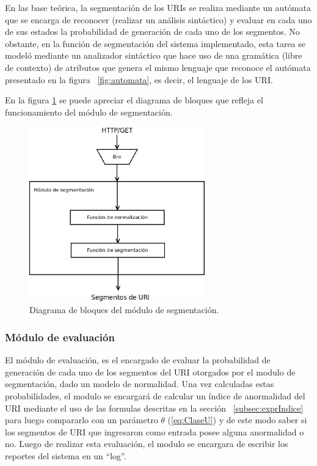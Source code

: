  En las base teórica, la segmentación de los URIs se realiza mediante un autómata que se encarga de reconocer (realizar un análisis sintáctico) y evaluar en cada uno de sus estados la probabilidad de generación de cada uno de los segmentos.  No obstante, en la función de segmentación del sistema implementado, esta tarea se modeló mediante un analizador sintáctico que hace uso de una gramática (libre de contexto) de atributos que genera el mismo lenguaje que reconoce el autómata presentado en la figura ~\ref{fig:automata}, es decir, el lenguaje de los URI.

En la figura \ref{fig:arquiSegmentacion} se puede apreciar el diagrama de bloques que refleja el funcionamiento del módulo de segmentación.

\begin{figure}[!htb]
\begin{center}
\includegraphics[width=3in]{./img/segArquiCompleta.jpeg}
\caption{Diagrama de bloques del módulo de segmentación.}
\label{fig:arquiSegmentacion}
\end{center}
\end{figure}

\subsubsection{Módulo de evaluación}
\label{sec:evaluacion}

El módulo de evaluación, es el encargado de evaluar la probabilidad de generación de cada uno de los segmentos del URI otorgados por el modulo de segmentación, dado un modelo de normalidad. Una vez calculadas estas probabilidades, el modulo se encargará de calcular un índice de anormalidad del URI mediante el uso de las formulas descritas en la sección ~\ref{subsec:exprIndice} para luego compararlo con un parámetro $\theta$ (\ref{eq:ClaseU}) y de este modo saber si los segmentos de URI que ingresaron como entrada posee alguna anormalidad o no. Luego de realizar esta evaluación, el modulo se encargara de escribir los reportes del sistema en un ``log''.

